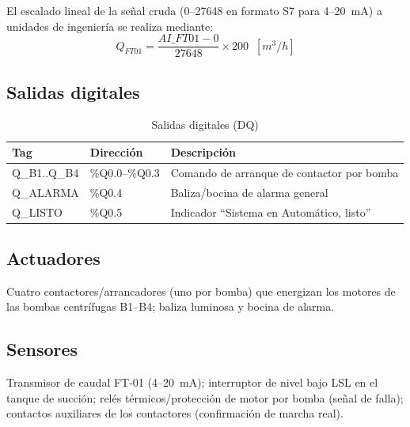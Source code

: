 \documentclass[conference]{IEEEtran}
\begin{document}
El escalado lineal de la señal cruda (0--27648 en formato S7 para 4--20~mA) a unidades de ingeniería se realiza mediante:
\begin{equation}
Q_{FT01} = \frac{AI\_FT01 - 0}{27648} \times 200 \;\;[\si{m^3/h}]
\label{eq:escalado}
\end{equation}

\subsection{Salidas digitales}
\begin{table}[H]
\centering
\caption{Salidas digitales (DQ)}
\label{tab:dq}
\renewcommand{\arraystretch}{1.2}
\begin{tabular}{|l|l|p{3.6cm}|}
\hline
\textbf{Tag} & \textbf{Dirección} & \textbf{Descripción} \\
\hline
Q\_B1..Q\_B4 & \%Q0.0--\%Q0.3 & Comando de arranque de contactor por bomba \\ \hline
Q\_ALARMA & \%Q0.4 & Baliza/bocina de alarma general \\ \hline
Q\_LISTO & \%Q0.5 & Indicador ``Sistema en Automático, listo'' \\ \hline
\end{tabular}
\end{table}

\subsection{Actuadores}
Cuatro contactores/arrancadores (uno por bomba) que energizan los motores de las bombas centrífugas B1--B4; baliza luminosa y bocina de alarma.

\subsection{Sensores}
Transmisor de caudal FT-01 (4--20~mA); interruptor de nivel bajo LSL en el tanque de succión; relés térmicos/protección de motor por bomba (señal de falla); contactos auxiliares de los contactores (confirmación de marcha real).
\end{document}
